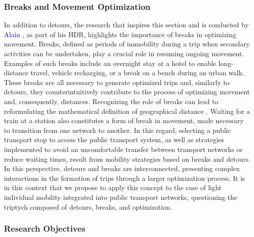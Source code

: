 \begin{refsegment}
\subsubsection*{Breaks and Movement Optimization
    \label{chap5:pauses-optimisation}
    }

In addition to detours, the research that inspires this section and is conducted by \textcolor{blue}{Alain} \textcolor{blue}{\textcite[447]{lhostis_detour_2017}}, as part of his \acrfull{HDR}, highlights the importance of breaks in optimizing movement. Breaks, defined as periods of immobility during a trip when secondary activities can be undertaken, play a crucial role in resuming ongoing movement. Examples of such breaks include an overnight stay at a hotel to enable long-distance travel, vehicle recharging, or a break on a bench during an urban walk. These breaks are all necessary to generate optimized trips and, similarly to detours, they counterintuitively contribute to the process of optimizing movement and, consequently, distances. Recognizing the role of breaks can lead to reformulating the mathematical definition of geographical distance \textcolor{blue}{\autocite[12]{kloeckner_metrics_2023}}. Waiting for a train at a station also constitutes a form of break in movement, made necessary to transition from one network to another. In this regard, selecting a public transport stop to access the public transport system, as well as strategies implemented to avoid an uncomfortable transfer between transport networks or reduce waiting times, result from mobility strategies based on breaks and detours. In this perspective, detours and breaks are interconnected, presenting complex interactions in the formation of trips through a larger optimization process. It is in this context that we propose to apply this concept to the case of light individual mobility integrated into public transport networks, questioning the triptych composed of detours, breaks, and optimization.%

\subsubsection*{Research Objectives
    \label{chap5:objectifs-recherche}
    }


\end{refsegment}
